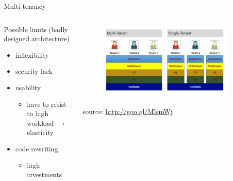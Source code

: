 \begin{frame}{Multi-tenancy}
{\begin{columns}
\begin{column}{0.6\textwidth}
				Possible limits (\tiny{badly designed architecture}\normalsize{)}
				\begin{itemize}
					\item{\footnotesize{inflexibility}}
					\item{\footnotesize{security lack}}
					\item{\footnotesize{usability}}
					\begin{itemize}
						\item{\scriptsize{have to resist to high workload $\rightarrow{}$ elasticity}}
					\end{itemize}
					\item{\footnotesize{code rewriting}}
					\begin{itemize}
						\item{\scriptsize{high investments}}
					\end{itemize}
				\end{itemize}
			\end{column}
			\begin{column}{0.4\textwidth}
				\begin{figure}
					\centering{}
					\includegraphics[scale=0.19]{images/multi-tenancy.png}
				\end{figure}
				\begin{flushright}
					\tiny{source: \url{http://goo.gl/MlsmWj}}
				\end{flushright}
			\end{column}
		\end{columns}
	}
\end{frame}